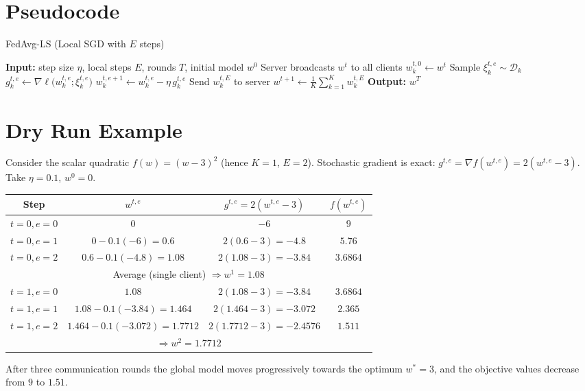 \documentclass{article}
\begin{document}
\section*{Pseudocode}
\begin{algorithm}[H]
\caption{FedAvg-LS (Local SGD with $E$ steps)}\label{alg:fedavg}
\begin{algorithmic}[1]
\State \textbf{Input:} step size $\eta$, local steps $E$, rounds $T$, initial model $w^{0}$
    \State Server broadcasts $w^{t}$ to all clients
        \State $w_{k}^{t,0}\gets w^{t}$
            \State Sample $\xi_{k}^{t,e}\sim\mathcal{D}_k$
            \State $g_{k}^{t,e}\gets\nabla\ell\bigl(w_{k}^{t,e};\xi_{k}^{t,e}\bigr)$
            \State $w_{k}^{t,e+1}\gets w_{k}^{t,e}-\eta\,g_{k}^{t,e}$ 
        \EndFor
        \State Send $w_{k}^{t,E}$ to server
    \EndFor
    \State $w^{t+1}\gets\frac1K\sum_{k=1}^{K}w_{k}^{t,E}$ 
\EndFor
\State \textbf{Output:} $w^{T}$
\end{algorithmic}
\end{algorithm}

\section*{Dry Run Example}
Consider the scalar quadratic $f(w)=(w-3)^{2}$ (hence $K=1$, $E=2$).  
Stochastic gradient is exact: $g^{t,e}= \nabla f(w^{t,e}) = 2(w^{t,e}-3)$.  
Take $\eta=0.1$, $w^{0}=0$.

\begin{center}
\begin{tabular}{c|c|c|c}
\textbf{Step} & $w^{t,e}$ & $g^{t,e}=2(w^{t,e}-3)$ & $f(w^{t,e})$\\\hline
$t=0,e=0$ & $0$ & $-6$ & $9$\\
$t=0,e=1$ & $0-0.1(-6)=0.6$ & $2(0.6-3)=-4.8$ & $5.76$\\
$t=0,e=2$ & $0.6-0.1(-4.8)=1.08$ & $2(1.08-3)=-3.84$ & $3.6864$\\
\multicolumn{4}{c}{Average (single client) $\Rightarrow w^{1}=1.08$}\\\hline
$t=1,e=0$ & $1.08$ & $2(1.08-3)=-3.84$ & $3.6864$\\
$t=1,e=1$ & $1.08-0.1(-3.84)=1.464$ & $2(1.464-3)=-3.072$ & $2.365$\\
$t=1,e=2$ & $1.464-0.1(-3.072)=1.7712$ & $2(1.7712-3)=-2.4576$ & $1.511$\\
\multicolumn{4}{c}{$\Rightarrow w^{2}=1.7712$}
\end{tabular}
\end{center}
After three communication rounds the global model moves progressively towards the optimum $w^{*}=3$, and the objective values decrease from $9$ to $1.51$.
\end{document}
